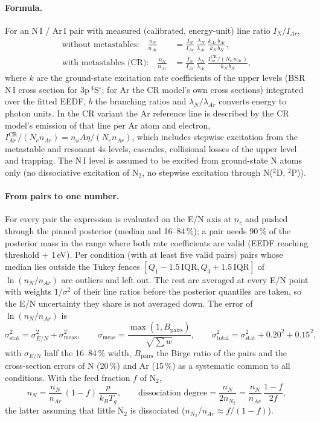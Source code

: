\documentclass[11pt]{article}
\newcommand{\EN}{E/N}
\newcommand{\nc}{n_c}
\begin{document}
\paragraph{Formula.} For an N\,I / Ar\,I pair with measured (calibrated, energy-unit) line ratio $I_N/I_{Ar}$,
\begin{align}
\text{without metastables:}\quad
\frac{n_N}{n_{Ar}} &= \frac{I_N}{I_{Ar}}\,\frac{\lambda_N}{\lambda_{Ar}}\,
  \frac{k_{Ar}\,b_{Ar}}{k_N\,b_N}, \\
\text{with metastables (CR):}\quad
\frac{n_N}{n_{Ar}} &= \frac{I_N}{I_{Ar}}\,\frac{\lambda_N}{\lambda_{Ar}}\,
  \frac{I^{\mathrm{CR}}_{Ar}/(N_e\, n_{Ar})}{k_N\,b_N},
\end{align}
where $k$ are the ground-state excitation rate coefficients of the upper levels (BSR N\,I cross section for
3p\,$^4$S$^\circ$; for Ar the CR model's own cross sections) integrated over the fitted EEDF, $b$ the branching
ratios and $\lambda_N/\lambda_{Ar}$ converts energy to photon units. In the CR variant the Ar reference line is
described by the CR model's emission of that line per Ar atom and electron, $I^{\mathrm{CR}}_{Ar}/(N_e n_{Ar}) =
n_u A\eta/(N_e n_{Ar})$, which includes stepwise excitation from the metastable and resonant 4s levels, cascades,
collisional losses of the upper level and trapping. The N\,I level is assumed to be excited from ground-state N
atoms only (no dissociative excitation of N$_2$, no stepwise excitation through N($^2$D, $^2$P)).

\paragraph{From pairs to one number.} For every pair the expression is evaluated on the \EN{} axis at $\nc$ and
pushed through the pinned posterior (median and 16--84\,\%); a pair needs 90\,\% of the posterior mass in the range
where both rate coefficients are valid (EEDF reaching threshold + 1\,eV). Per condition (with at least five valid
pairs) pairs whose median lies outside the Tukey fences $[Q_1 - 1.5\,\mathrm{IQR}, Q_3 + 1.5\,\mathrm{IQR}]$ of
$\ln(n_N/n_{Ar})$ are outliers and left out. The rest are averaged at every \EN{} point with weights
$1/\sigma^2$ of their line ratios before the posterior quantiles are taken, so the \EN{} uncertainty they share is
not averaged down. The error of $\ln(n_N/n_{Ar})$ is
\begin{equation}
\sigma_{\mathrm{stat}}^2 = \sigma_{\EN}^2 + \sigma_{\mathrm{meas}}^2,\qquad
\sigma_{\mathrm{meas}} = \frac{\max(1, B_{\mathrm{pairs}})}{\sqrt{\sum w}},\qquad
\sigma_{\mathrm{total}}^2 = \sigma_{\mathrm{stat}}^2 + 0.20^2 + 0.15^2 ,
\end{equation}
with $\sigma_{\EN}$ half the 16--84\,\% width, $B_{\mathrm{pairs}}$ the Birge ratio of the pairs and the cross-section
errors of N (20\,\%) and Ar (15\,\%) as a systematic common to all conditions. With the feed fraction $f$ of N$_2$,
\begin{equation}
n_N = \frac{n_N}{n_{Ar}}\,(1-f)\,\frac{p}{k_BT_g},\qquad
\text{dissociation degree} = \frac{n_N}{2 n_{N_2}} = \frac{n_N}{n_{Ar}}\,\frac{1-f}{2f},
\end{equation}
the latter assuming that little N$_2$ is dissociated ($n_{N_2}/n_{Ar}\approx f/(1-f)$).
\end{document}
